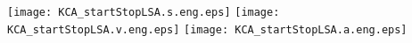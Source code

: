 \documentclass[a4paper,12pt]{article}
\begin{document}

\begin{center}
\texttt{[image: KCA\_startStopLSA.s.eng.eps]} 
\texttt{[image: KCA\_startStopLSA.v.eng.eps]}
\texttt{[image: KCA\_startStopLSA.a.eng.eps]}
\end{center}

\end{document}

